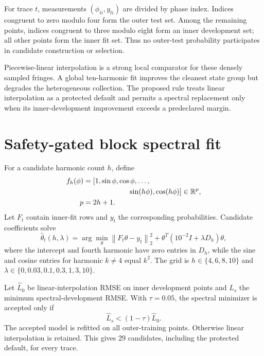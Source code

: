 \documentclass[10pt,letterpaper,twoside]{article}
\newcommand{\norm}[1]{\left\lVert#1\right\rVert}
\begin{document}
For trace $t$, measurements $(\phi_{ti},y_{ti})$ are divided by phase index.
Indices congruent to zero modulo four form the outer test set. Among the
remaining points, indices congruent to three modulo eight form an inner
development set; all other points form the inner fit set. Thus no outer-test
probability participates in candidate construction or selection.

Piecewise-linear interpolation is a strong local comparator for these densely
sampled fringes. A global ten-harmonic fit improves the cleanest state group
but degrades the heterogeneous collection. The proposed rule treats linear
interpolation as a protected default and permits a spectral replacement only
when its inner-development improvement exceeds a predeclared margin.

\section{Safety-gated block spectral fit}

For a candidate harmonic count $h$, define
\begin{equation}
 \begin{aligned}
 f_h(\phi)&=[1,\sin\phi,\cos\phi,\ldots,\\
 &\hspace{2.2cm}\sin(h\phi),\cos(h\phi)]\in\mathbb R^p,\\
 p&=2h+1.
 \end{aligned}
\end{equation}
Let $F_t$ contain inner-fit rows and $y_t$ the corresponding probabilities.
Candidate coefficients solve
\begin{equation}
 \widehat\theta_t(h,\lambda)=
 \arg\min_\theta \norm{F_t\theta-y_t}_2^2+
 \theta^T(10^{-2}I+\lambda D_h)\theta, \label{eq:local}
\end{equation}
where the intercept and fourth harmonic have zero entries in $D_h$, while
the sine and cosine entries for harmonic $k\ne4$ equal $k^2$. The grid is
$h\in\{4,6,8,10\}$ and
$\lambda\in\{0,0.03,0.1,0.3,1,3,10\}$.

Let $\widehat L_0$ be linear-interpolation RMSE on inner development points
and $\widehat L_s$ the minimum spectral-development RMSE. With $\tau=0.05$,
the spectral minimizer is accepted only if
\begin{equation}
 \widehat L_s<(1-\tau)\widehat L_0. \label{eq:gate}
\end{equation}
The accepted model is refitted on all outer-training points. Otherwise linear
interpolation is retained. This gives 29 candidates, including the protected
default, for every trace.
\end{document}
